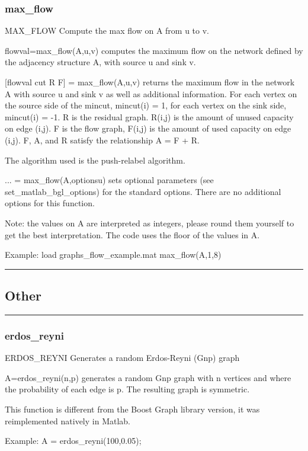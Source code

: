 \subsubsection*{max\_flow}
\begin{mcode}
  MAX_FLOW Compute the max flow on A from u to v.
 
  flowval=max_flow(A,u,v) computes the maximum flow on the network defined by
  the adjacency structure A, with source u and sink v.
 
  [flowval cut R F] = max_flow(A,u,v) returns the maximum flow in the 
  network A with source u and sink v as well as additional information.  
  For each vertex on the source side of the mincut, mincut(i) = 1, 
  for each vertex on the sink side, mincut(i) = -1.  
  R is the residual graph.  R(i,j) is the amount of unused capacity 
  on edge (i,j).  F is the flow graph, F(i,j) is the amount of used 
  capacity on edge (i,j).  F, A, and R satisfy the relationship A = F + R.
 
  The algorithm used is the push-relabel algorithm.
 
  ... = max_flow(A,optionsu) sets optional parameters (see 
  set_matlab_bgl_options) for the standard options.
    There are no additional options for this function.
 
  Note: the values on A are interpreted as integers, please round them
  yourself to get the best interpretation.  The code uses the floor of 
  the values in A.
 
  Example:
     load graphs\max_flow_example.mat
     max_flow(A,1,8)
\end{mcode}
\newpage
\hrule
\subsection*{Other}
\vspace{1cm}
\hrule
\subsubsection*{erdos\_reyni}
\begin{mcode}
  ERDOS_REYNI Generates a random Erdos-Reyni (Gnp) graph
 
  A=erdos_reyni(n,p) generates a random Gnp graph with n vertices and where
  the probability of each edge is p.  The resulting graph is symmetric.
 
  This function is different from the Boost Graph library version, it was
  reimplemented natively in Matlab.
 
  Example:
    A = erdos_reyni(100,0.05);
\end{mcode}
\newpage
